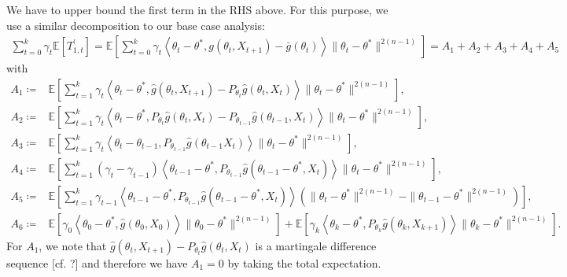 \documentclass[a4paper]{article}
\newcommand{\norm}[1]{\|#1 \|}
\newcommand{\Exs}{\mathbb{E}}
\newcommand{\thetastar}{\theta^*}
\newcommand{\constTprime}[1]{T_{#1}^{\prime}}
\begin{document}
	We have to upper bound the first term in the RHS above. For this purpose, we use a similar decomposition to our base case analysis:
	\begin{align*}
		\sum_{t = 0}^{k}\gamma_{t}\Exs\left[\constTprime{1, t}\right] = \Exs\left[\sum_{t = 0}^{k}\gamma_{t}\left\langle \theta_{t} - \thetastar, g\left(\theta_{t}, X_{t + 1}\right) - \bar{g}\left(\theta_{t}\right)\right\rangle\norm{\theta_{t} - \thetastar}^{2(n - 1)}\right] = A_{1} + A_{2} + A_{3} + A_{4} + A_{5}
	\end{align*} 
	with
	\begin{align*}
		A_{1} \coloneq & \Exs\left[\sum_{t = 1}^{k}\gamma_{t}\left\langle \theta_{t} - \thetastar, \hat{g}\left(\theta_{t}, X_{t + 1}\right) - P_{\theta_{t}}\hat{g}\left(\theta_{t}, X_{t}\right) \right\rangle\norm{\theta_{t} - \thetastar}^{2(n - 1)}\right],\\
		A_{2} \coloneq & \Exs\left[\sum_{t = 1}^{k}\gamma_{t}\left\langle \theta_{t} - \thetastar, P_{\theta_{t}}\hat{g}\left(\theta_{t}, X_{t}\right) - P_{\theta_{t - 1}}\hat{g}\left( \theta_{t - 1}, X_{t} \right) \right\rangle\norm{\theta_{t} - \thetastar}^{2(n - 1)}\right],\\
		A_{3} \coloneq & \Exs\left[\sum_{t = 1}^{k}\gamma_{t}\left\langle \theta_{t} - \theta_{t - 1}, P_{\theta_{t - 1}}\hat{g}\left( \theta_{t - 1} X_{t}\right) \right\rangle \norm{\theta_{t} - \thetastar}^{2(n - 1)}\right],\\
		A_{4} \coloneq & \Exs\left[\sum_{t = 1}^{k}\left(\gamma_{t} - \gamma_{t - 1}\right)\left\langle \theta_{t - 1} - \thetastar, P_{\theta_{t - 1}}\hat{g}\left( \theta_{t - 1} - \thetastar, X_{t}\right) \right\rangle\norm{\theta_{t} - \thetastar}^{2(n - 1)}\right],\\
		A_{5} \coloneq & \Exs\left[\sum_{t = 1}^{k}\gamma_{t - 1}\left\langle \theta_{t - 1} - \thetastar, P_{\theta_{t - 1}}\hat{g}\left(\theta_{t - 1} - \thetastar, X_{t}\right)\right\rangle\left(\norm{\theta_{t} - \thetastar}^{2(n - 1)} - \norm{\theta_{t - 1} - \thetastar}^{2(n - 1)}\right)\right],\\
		A_{6} \coloneq & \Exs\left[\gamma_{0}\left\langle \theta_{0} - \thetastar, \hat{g}\left(\theta_{0}, X_{0}\right) \right\rangle\norm{\theta_{0} - \thetastar}^{2(n - 1)}\right] + \Exs\left[\gamma_{k}\left\langle \theta_{k} - \thetastar, P_{\theta_{k}}\hat{g}\left(\theta_{k}, X_{k + 1}\right)\right\rangle\norm{\theta_{k} - \thetastar}^{2(n - 1)}\right].
	\end{align*}
	For $A_{1}$, we note that $\hat{g}\left(\theta_{t}, X_{t + 1}\right) - P_{\theta_{t}} \hat{g}\left(\theta_{t}, X_{t}\right)$ is a martingale difference sequence [cf. ?] and therefore we have $A_{1} = 0$ by taking the total expectation.
	
\end{document}
